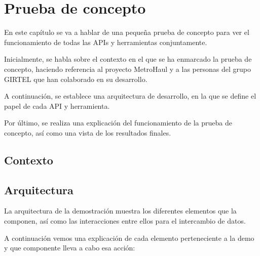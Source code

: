 \chapter{Prueba de concepto}
\label{pruebaconcepto}

En este capítulo se va a hablar de una pequeña prueba de concepto para ver el funcionamiento de todas las APIs y herramientas conjuntamente.

Inicialmente, se habla sobre el contexto en el que se ha enmarcado la prueba de concepto, haciendo referencia al proyecto MetroHaul y a las personas del grupo GIRTEL que han colaborado en su desarrollo.

A continuación, se establece una arquitectura de desarrollo, en la que se define el papel de cada API y herramienta.

Por último, se realiza una explicación del funcionamiento de la prueba de concepto, así como una vista de los resultados finales.

\section{Contexto}
\label{sec:contexto}

\section{Arquitectura}
\label{sec:arquitectura}

La arquitectura de la demostración muestra los diferentes elementos que la componen, así como las interacciones entre ellos para el intercambio de datos.

A continuación vemos una explicación de cada elemento perteneciente a la demo y que componente lleva a cabo esa acción:

